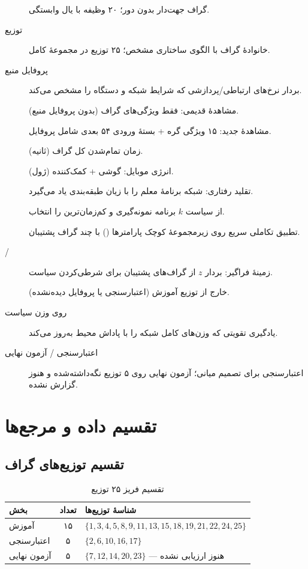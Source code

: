 \documentclass[11pt,a4paper]{article}
\newcommand{\T}{\lr{T}}
\begin{document}
\begin{description}
  \item[] گراف جهت‌دار بدون دور؛ ۲۰ وظیفه با یال وابستگی.
  \item[توزیع] خانوادهٔ گراف با الگوی ساختاری مشخص؛ ۲۵ توزیع در مجموعهٔ کامل.
  \item[پروفایل منبع] بردار نرخ‌های ارتباطی/پردازشی که شرایط شبکه و دستگاه را مشخص می‌کند.
  \item[] مشاهدهٔ قدیمی: فقط ویژگی‌های گراف (بدون پروفایل منبع).
  \item[] مشاهدهٔ جدید: ۱۵ ویژگی گره + بستهٔ ورودی ۵۴ بعدی شامل پروفایل.
  \item[\T] زمان تمام‌شدن کل گراف (ثانیه).
  \item[] انرژی موبایل: گوشی + کمک‌کننده (ژول).
  \item[] تقلید رفتاری: شبکه برنامهٔ معلم را با زیان طبقه‌بندی یاد می‌گیرد.
  \item[] از سیاست $k$ برنامه نمونه‌گیری و کم‌زمان‌ترین را انتخاب.
  \item[] تطبیق تکاملی سریع روی زیرمجموعهٔ کوچک پارامترها () با چند گراف پشتیبان.
  \item[/] زمینهٔ فراگیر: بردار $z$ از گراف‌های پشتیبان برای شرطی‌کردن سیاست.
  \item[] خارج از توزیع آموزش (اعتبارسنجی یا پروفایل دیده‌نشده).
  \item[ روی وزن سیاست] یادگیری تقویتی که وزن‌های کامل شبکه را با پاداش محیط به‌روز می‌کند.
  \item[اعتبارسنجی / آزمون نهایی] اعتبارسنجی برای تصمیم میانی؛ آزمون نهایی روی ۵ توزیع نگه‌داشته‌شده و هنوز گزارش نشده.
\end{description}

\section{تقسیم داده و مرجع‌ها}
\label{sec:contracts}

\subsection{تقسیم توزیع‌های گراف}

\begin{table}[H]
\centering
\caption{تقسیم فریز ۲۵ توزیع}
\label{tab:split}
\begin{tabular}{lcp{7.5cm}}
\toprule
\rowcolor{ink!12} بخش & تعداد & شناسهٔ توزیع‌ها \\
\midrule
آموزش & ۱۵ & $\{1,3,4,5,8,9,11,13,15,18,19,21,22,24,25\}$ \\
اعتبارسنجی & ۵ & $\{2,6,10,16,17\}$ \\
آزمون نهایی & ۵ & $\{7,12,14,20,23\}$ — هنوز ارزیابی نشده \\
\bottomrule
\end{tabular}
\end{table}
\end{document}
